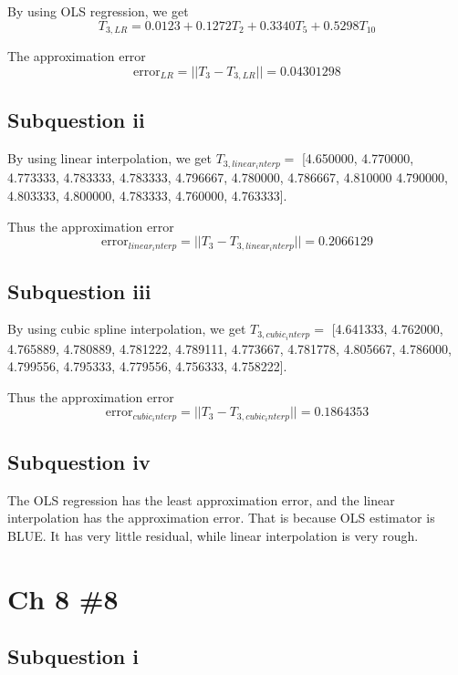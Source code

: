 \documentclass{article}
\DeclareMathOperator{\1}{\mathit{1}}
\numberwithin{figure}{section} %
\numberwithin{table}{section}
\begin{document}
By using OLS regression, we get
	\begin{equation*}
	T_{3,LR} = 0.0123 + 0.1272T_2 + 0.3340T_5 + 0.5298T_{10}
	\end{equation*}

The approximation error
	\begin{equation*}
	\mathrm{error}_{LR} = ||T_3 - T_{3,LR} || = 0.04301298
	\end{equation*}

\subsection{Subquestion ii}
By using linear interpolation, we get $T_{3, linear_interp} = $ [4.650000, 4.770000, 4.773333, 4.783333, 4.783333, 4.796667, 4.780000, 4.786667, 4.810000
4.790000, 4.803333, 4.800000, 4.783333, 4.760000, 4.763333].

Thus the approximation error
	\begin{equation*}
	\mathrm{error}_{linear_interp} = ||T_3 - T_{3,linear_interp} || = 0.2066129
	\end{equation*}
	
\subsection{Subquestion iii}
By using cubic spline interpolation, we get $T_{3, cubic_interp} = $ [4.641333, 4.762000, 4.765889, 4.780889, 4.781222, 4.789111, 4.773667, 4.781778, 4.805667, 4.786000, 
4.799556, 4.795333, 4.779556, 4.756333, 4.758222].

Thus the approximation error
	\begin{equation*}
	\mathrm{error}_{cubic_interp} = ||T_3 - T_{3,cubic_interp} || = 0.1864353
	\end{equation*}

\subsection{Subquestion iv}
The OLS regression has the least approximation error, and the linear interpolation has the approximation error. That is because OLS estimator is BLUE. It has very little residual, while linear interpolation is very rough.

\section{Ch 8 \#8}
\subsection{Subquestion i}
\end{document}

